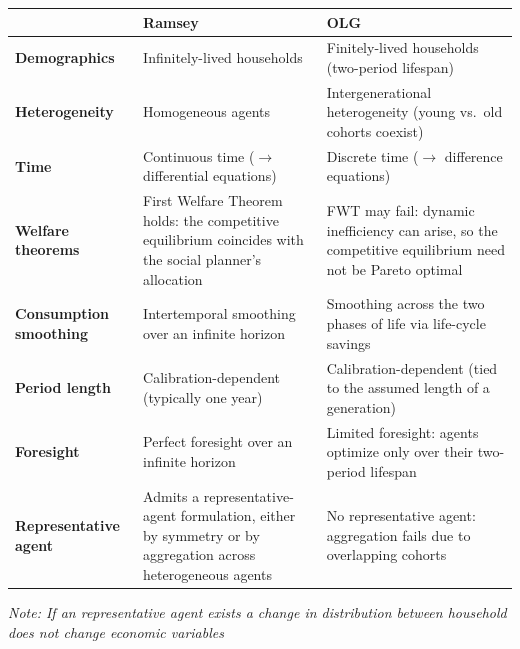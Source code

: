 \begin{tcolorbox}[
    colback=green!5!white, %
    colframe=darkgreen!40!white, %
   title=Comparison of Ramsey and OLG, %
    fonttitle=\bfseries %
    ]

\begin{table}[H]
\centering
\renewcommand{\arraystretch}{1.4}
\setlength{\tabcolsep}{4pt}
\begin{tabularx}{\linewidth}{|>{\bfseries\RaggedRight\arraybackslash}p{2.8cm}|>{\RaggedRight\arraybackslash}X|>{\RaggedRight\arraybackslash}X|}
\hline
 & \textbf{Ramsey} & \textbf{OLG} \\
\hline
Demographics
  & Infinitely-lived households
  & Finitely-lived households \newline (two-period lifespan) \\
\hline
Heterogeneity
  & Homogeneous agents
  & Intergenerational heterogeneity \newline (young vs.\ old cohorts coexist) \\
\hline
Time
  & Continuous time \newline ($\rightarrow$ differential equations)
  & Discrete time \newline ($\rightarrow$ difference equations) \\
\hline
Welfare theorems
  & First Welfare Theorem holds: the competitive equilibrium coincides with the social planner's allocation
  & FWT may fail: dynamic inefficiency can arise, so the competitive equilibrium need not be Pareto optimal \\
\hline
Consumption smoothing
  & Intertemporal smoothing over an infinite horizon
  & Smoothing across the two phases of life via life-cycle savings \\
\hline
Period length
  & Calibration-dependent (typically one year)
  & Calibration-dependent (tied to the assumed length of a generation) \\
\hline
Foresight
  & Perfect foresight over an infinite horizon
  & Limited foresight: agents optimize only over their two-period lifespan \\
\hline
Representative agent
  & Admits a representative-agent formulation, either by symmetry or by aggregation across heterogeneous agents
  & No representative agent: aggregation fails due to overlapping cohorts \\
\hline
\end{tabularx}
\label{tab:ramsey-olg}
\end{table}
\textit{Note: If an representative agent exists a change in distribution between household does not change economic variables }
\end{tcolorbox}

